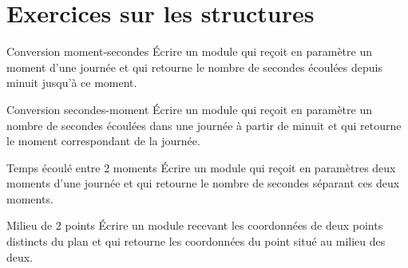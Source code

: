 
\section{Exercices sur les structures}

\begin{Exercice}{Conversion moment-secondes}
	Écrire un module qui reçoit en paramètre un
	moment d’une journée et qui retourne le nombre de secondes écoulées
	depuis minuit jusqu’à ce moment.
\end{Exercice}

\begin{Exercice}{Conversion secondes-moment}
	Écrire un module qui reçoit en paramètre un
	nombre de secondes écoulées dans une journée à partir de minuit et qui
	retourne le moment correspondant de la journée.
\end{Exercice}

\begin{Exercice}{Temps écoulé entre 2 moments}
	Écrire un module qui reçoit en paramètres deux
	moments d’une journée et qui retourne le nombre de secondes séparant
	ces deux moments.
\end{Exercice}

\begin{Exercice}{Milieu de 2 points}
	Écrire un module recevant les coordonnées de
	deux points distincts du plan et qui retourne les coordonnées du point
	situé au milieu des deux.
\end{Exercice}

